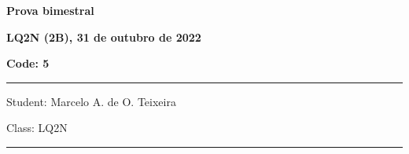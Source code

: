 \documentclass[12pt, addpoints]{exam}
\begin{document}
    \begin{minipage}[b]{0.75\linewidth}
        \begin{flushleft}
            {\bf \large Prova bimestral}
        \end{flushleft}
        \begin{flushleft}
            {\bf \large LQ2N (2B), 31 de outubro de 2022}
        \end{flushleft}
    \end{minipage}
    \begin{minipage}[b]{0.20\linewidth}
        \begin{flushright}
            {\bf \large Code: 5}
        \end{flushright}
    \end{minipage}
    \vspace{0.5cm} \hrule \vspace{0.5cm}
    \begin{minipage}{0.75\linewidth}
        \begin{flushleft}
            Student: Marcelo A. de O. Teixeira
        \end{flushleft}
    \end{minipage}
    \begin{minipage}{0.20\linewidth}
        \begin{flushright}
            Class: LQ2N
        \end{flushright}
    \end{minipage}
    \vspace{0.5cm} \hrule \vspace{0.5cm}
\end{document}
